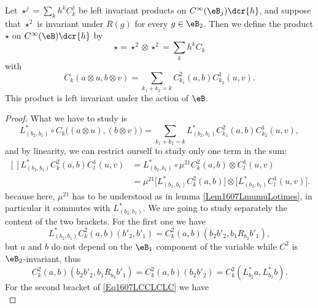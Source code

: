 \begin{theorem}
	Let $\star^j=\sum_kh^kC_k^j$ be left invariant products on $ C^{\infty}(\eB_j)\dcr{h}$, and suppose that $\star^2$ is invariant under $R(g)$ for every $g\in \eB_2$. Then we define the product $\star$ on $ C^{\infty}(\eB)\dcr{h}$ by
	\begin{equation}
		\star=\star^2\otimes\star^2=\sum_kh^kC_k
	\end{equation}
	with
	\begin{equation}
		C_k(a\otimes u,b\otimes v)=\sum_{k_1+k_2=k}C_{k_1}^2(a,b)C^1_{k_2}(u,v).
	\end{equation}
	This product is left invariant under the action of $\eB$.
\end{theorem}

\begin{proof}
	What we have to study is
	\begin{equation}
		L^*_{(b_2,b_1)}\circ C_k\big( (a\otimes u),(b\otimes v) \big)=\sum_{k_1+k_2=k}L^*_{(b_2,b_1)}C^2_{k_1}(a,b)C^1_{k_2}(u,v),
	\end{equation}
	and by linearity, we can restrict ourself to study only one term in the sum:
	\begin{equation}		\label{Eq1607LCCLCLC}
		\begin{aligned}[]
			L^*_{(b_2,b_1)}C_k^2(a,b)C_l^1(u,v)&=L^*_{(b_2,b_1)}\circ\mu^{21}C^2_k(a,b)\otimes C^1_l(u,v)\\
			&=\mu^{21}\Big[ L^*_{(b_2,b_1)}C^2_k(a,b) \Big]\otimes\Big[ L^*_{(b_2,b_1)}C_l^1(u,v) \Big].
		\end{aligned}
	\end{equation}
	because here, $\mu^{21}$ has to be understood as in lemma \ref{Lem1607LmumuLotimes}, in particular it commutes with $L^*_{(b_2,b_1)}$. We are going to study separately the content of the two brackets. For the first one we have
	\begin{equation}
		L^*_{(b_2,b_1)}C^2_k(a,b)(b'_2,b'_1)=C^2_k(a,b)(b_2b'_2,b_1R_{b_2}b'_1),
	\end{equation}
	but $a$ and $b$ do not depend on the $\eB_1$ component of the variable while $C^2$ is $\eB_2$-invariant, thus
	\begin{equation}	\label{Eq1607BrackUnMu}
		C^2_k(a,b)(b_2b'_2,b_1R_{b_2}b'_1)=C^2_k(a,b)(b_2b'_2)
		=C^2_k(L^*_{b_2}a,L^*_{b_2}b).
	\end{equation}
	For the second bracket of \eqref{Eq1607LCCLCLC} we have
	\begin{equation}		\label{1607BrackDeuxMu}

\end{equation}
\end{proof}
